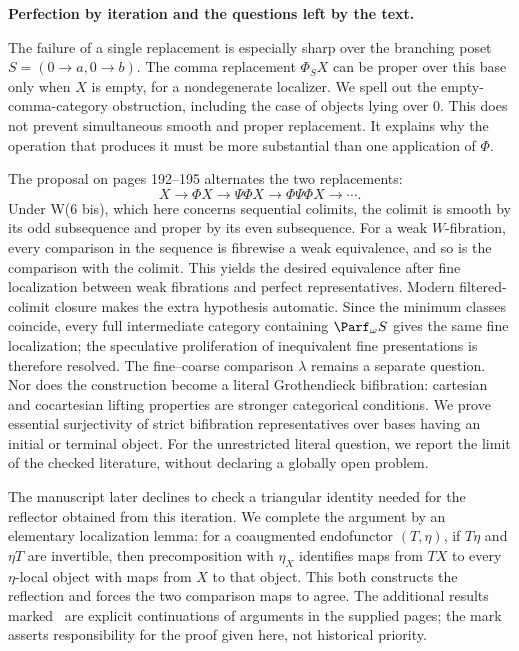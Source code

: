 \medskip\noindent\textbf{Perfection by iteration and the questions left by the text.}

The failure of a single replacement is especially sharp over the branching poset $S=(0\to a,0\to b)$. The comma replacement $\Phi_SX$ can be proper over this base only when $X$ is empty, for a nondegenerate localizer. We spell out the empty-comma-category obstruction, including the case of objects lying over $0$. This does not prevent simultaneous smooth and proper replacement. It explains why the operation that produces it must be more substantial than one application of $\Phi$.

The proposal on pages 192--195 alternates the two replacements:
\[
 X\longrightarrow\Phi X\longrightarrow\Psi\Phi X
 \longrightarrow\Phi\Psi\Phi X\longrightarrow\cdots.
\]
Under W(6 bis), which here concerns sequential colimits, the colimit is smooth by its odd subsequence and proper by its even subsequence. For a weak $W$-fibration, every comparison in the sequence is fibrewise a weak equivalence, and so is the comparison with the colimit. This yields the desired equivalence after fine localization between weak fibrations and perfect representatives. Modern filtered-colimit closure makes the extra hypothesis automatic. Since the minimum classes coincide, every full intermediate category containing $\Parf_\omega S$ gives the same fine localization; the speculative proliferation of inequivalent fine presentations is therefore resolved. The fine--coarse comparison $\lambda$ remains a separate question. Nor does the construction become a literal Grothendieck bifibration: cartesian and cocartesian lifting properties are stronger categorical conditions. We prove essential surjectivity of strict bifibration representatives over bases having an initial or terminal object. For the unrestricted literal question, we report the limit of the checked literature, without declaring a globally open problem.

The manuscript later declines to check a triangular identity needed for the reflector obtained from this iteration. We complete the argument by an elementary localization lemma: for a coaugmented endofunctor $(T,\eta)$, if $T\eta$ and $\eta T$ are invertible, then precomposition with $\eta_X$ identifies maps from $TX$ to every $\eta$-local object with maps from $X$ to that object. This both constructs the reflection and forces the two comparison maps to agree. The additional results marked \ours\ are explicit continuations of arguments in the supplied pages; the mark asserts responsibility for the proof given here, not historical priority.

